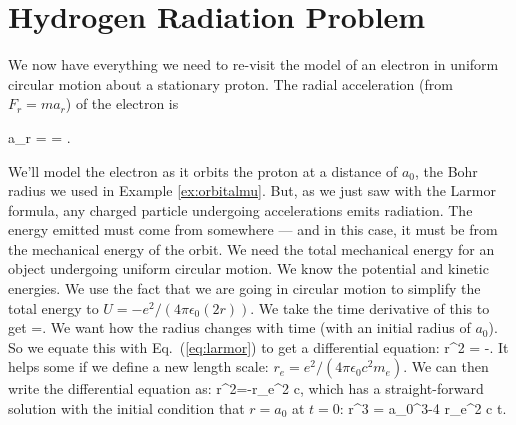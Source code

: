 \section{Hydrogen Radiation Problem}
We now have everything we need to re-visit the model of an electron in uniform circular motion about a stationary proton. The radial acceleration (from $F_r = m a_r$) of the electron is
\begin{marginfigure}\centering
{}
\end{marginfigure}
\beq
a_r =  = .
\eeq

We'll model the electron as it orbits the proton at a distance of $a_0$, the Bohr radius we used in Example \ref{ex:orbitalmu}. But, as we just saw with the Larmor formula, any charged particle undergoing accelerations emits radiation. The energy emitted must come from somewhere --- and in this case, it must be from the mechanical energy of the orbit. We need the total mechanical energy for an object undergoing uniform circular motion. We know the potential and kinetic energies. We use the fact that we are going in circular motion to simplify the total energy to $U = -e^2/(4\pi\epsilon_0 (2r))$.  We take the time derivative of this to get
\beq
{}=.
\label{eq:energyderivative}
\eeq
We want how the radius changes with time (with an initial radius of $a_0$). So we equate this with Eq.~(\ref{eq:larmor}) to get a differential equation: 
\beq
{}r^2 = -.
\label{eq:rrdot}
\eeq
It helps some if we define a new length scale: $r_e = e^2/(4\pi\epsilon_0 c^2 m_e)$. We can then write the differential equation as:
\beq
{}r^2=-r_e^2 c,
\eeq
which has a straight-forward solution with the initial condition that $r=a_0$ at $t=0$: 
\beq
r^3 = a_0^3-4 r_e^2 c t.
\label{eq:orbitdecay}
\eeq

